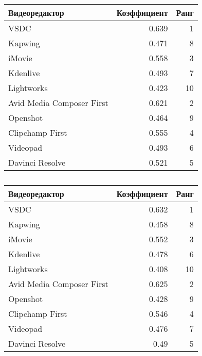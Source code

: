 \begin{table}[h!tp]
    \centering
    \caption{}
    \label{table:saw:result}
    \begin{tabular}{|l|r|r|}
        \hline Видеоредактор & Коэффициент & Ранг\\ \hline
        VSDC & 0.639 & 1\\ \hline
        Kapwing & 0.471 & 8\\ \hline
        iMovie & 0.558 & 3\\ \hline
        Kdenlive & 0.493 & 7\\ \hline
        Lightworks & 0.423 & 10\\ \hline
        Avid Media Composer First & 0.621 & 2 \\ \hline
        Openshot & 0.464 & 9\\ \hline
        Clipchamp First & 0.555 & 4 \\ \hline
        Videopad & 0.493  & 6\\ \hline
        Davinci Resolve & 0.521 & 5 \\ \hline
    \end{tabular}
\end{table}

\begin{table}[h!tp]
    \centering
    \caption{}
    \label{table:mout:result}
    \begin{tabular}{|l|r|r|}
        \hline Видеоредактор & Коэффициент & Ранг\\ \hline
        VSDC & 0.632 & 1\\ \hline
        Kapwing & 0.458 & 8\\ \hline
        iMovie & 0.552 & 3\\ \hline
        Kdenlive & 0.478 & 6\\ \hline
        Lightworks & 0.408 & 10\\ \hline
        Avid Media Composer First & 0.625 & 2 \\ \hline
        Openshot & 0.428 & 9\\ \hline
        Clipchamp First & 0.546 & 4 \\ \hline
        Videopad & 0.476  & 7\\ \hline
        Davinci Resolve & 0.49 & 5 \\ \hline
    \end{tabular}
\end{table}

